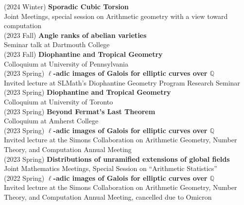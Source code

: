 \documentclass[margin,line]{res}
\begin{document}
\begin{resume}
(2024 Winter) \textbf{Sporadic Cubic Torsion}\\
Joint Meetings, special session on Arithmetic geometry with a view toward computation
\vspace{.05cm}\\  
(2023 Fall) \textbf{Angle ranks of abelian varieties}\\
Seminar talk at Dartmouth College
\vspace{.05cm}\\  
(2023 Fall) \textbf{Diophantine and Tropical Geometry}\\
Colloquium at University of Pennsylvania
\vspace{.05cm}\\  
(2023 Spring) \textbf{$\ell$-adic images of Galois for elliptic curves over $\mathbb{Q}$}\\
Invited lecture at SLMath's Diophantine Geometry Program Research Seminar
\vspace{.05cm}\\  
(2023 Spring) \textbf{Diophantine and Tropical Geometry}\\
Colloquium at University of Toronto
\vspace{.05cm}\\  
(2023 Spring) \textbf{Beyond Fermat's Last Theorem}\\
Colloquium at Amherst College
\vspace{.05cm}\\  
(2023 Spring) \textbf{$\ell$-adic images of Galois for elliptic curves over $\mathbb{Q}$}\\
Invited lecture at  the Simons Collaboration on Arithmetic Geometry, Number Theory, and Computation Annual Meeting
\vspace{.05cm}\\
(2023 Spring) \textbf{Distributions of unramified extensions of global fields}\\
Joint Mathematics Meetings, Special Session on ``Arithmetic Statistics''
\vspace{.05cm}\\
(2022 Spring) \textbf{$\ell$-adic images of Galois for elliptic curves over $\mathbb{Q}$}\\
Invited lecture at  the Simons Collaboration on Arithmetic Geometry, Number Theory, and Computation Annual Meeting, cancelled due to Omicron

\end{resume}
\end{document}
